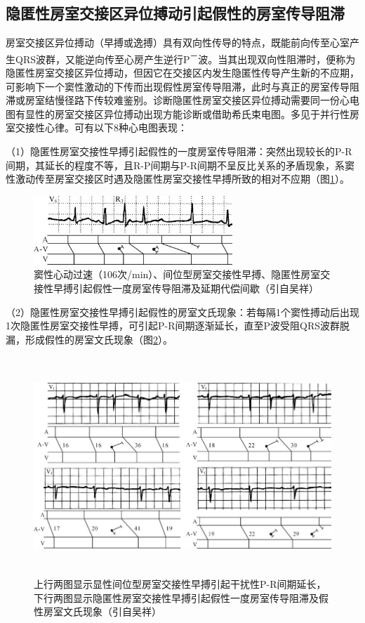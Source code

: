 \protect\hypertarget{text00042.htmlux5cux23subid459}{}{}

\subsection{隐匿性房室交接区异位搏动引起假性的房室传导阻滞}

房室交接区异位搏动（早搏或逸搏）具有双向性传导的特点，既能前向传至心室产生QRS波群，又能逆向传至心房产生逆行P\textsuperscript{－}波。当其出现双向性阻滞时，便称为隐匿性房室交接区异位搏动，但因它在交接区内发生隐匿性传导产生新的不应期，可影响下一个窦性激动的下传而出现假性房室传导阻滞，此时与真正的房室传导阻滞或房室结慢径路下传较难鉴别。诊断隐匿性房室交接区异位搏动需要同一份心电图有显性的房室交接区异位搏动出现方能诊断或借助希氏束电图。多见于并行性房室交接性心律。可有以下8种心电图表现：

（1）隐匿性房室交接性早搏引起假性的一度房室传导阻滞：突然出现较长的P-R间期，其延长的程度不等，且R-P间期与P-R间期不呈反比关系的矛盾现象，系窦性激动传至房室交接区时遇及隐匿性房室交接性早搏所致的相对不应期（图\ref{fig35-13}）。

\begin{figure}[!htbp]
 \centering
 \includegraphics[width=2.94792in,height=1.02083in]{./images/Image00566.jpg}
 \captionsetup{justification=centering}
 \caption{窦性心动过速（106次/min）、间位型房室交接性早搏、隐匿性房室交接性早搏引起假性一度房室传导阻滞及延期代偿间歇（引自吴祥）}
 \label{fig35-13}
  \end{figure} 

（2）隐匿性房室交接性早搏引起假性的房室文氏现象：若每隔1个窦性搏动后出现1次隐匿性房室交接性早搏，可引起P-R间期逐渐延长，直至P波受阻QRS波群脱漏，形成假性的房室文氏现象（图\ref{fig35-14}）。

\begin{figure}[!htbp]
 \centering
 \includegraphics[width=5.78125in,height=3.22917in]{./images/Image00567.jpg}
 \captionsetup{justification=centering}
 \caption{上行两图显示显性间位型房室交接性早搏引起干扰性P-R间期延长，下行两图显示隐匿性房室交接性早搏引起假性一度房室传导阻滞及假性房室文氏现象（引自吴祥）}
 \label{fig35-14}
  \end{figure} 


